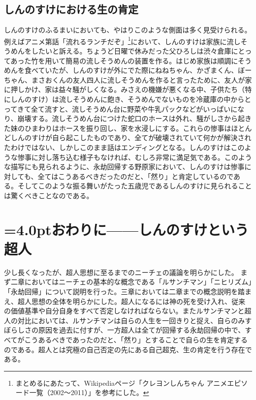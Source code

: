 \documentclass[b5j,twoside,twocolumn]{utarticle}
\begin{document}
\subsection{しんのすけにおける生の肯定}
しんのすけのふるまいにおいても、やはりこのような側面は多く見受けられる。例えばアニメ第話「流れるランチだぞ」\footnote{まとめるにあたって、Wikipediaページ「クレヨンしんちゃん アニメエピソード一覧（2002～2011）」を参考にした。}において、しんのすけは家族に流しそうめんをしたいと訴える。ちょうど日曜で休みだった父ひろしは渋々倉庫にとってあった竹を用いて簡易の流しそうめんの装置を作る。はじめ家族は順調にそうめんを食べていたが、しんのすけが外にでた際にねねちゃん、かざまくん、ぼーちゃん、まさおくんの友人四人に流しそうめんを作ると言ったために、友人が家に押しかけ、家は益々騒がしくなる。みさえの機嫌が悪くなる中、子供たち（特にしんのすけ）は流しそうめんに飽き、そうめんでないものを冷蔵庫の中からとってきて全て流すと、流しそうめん台に野菜や牛乳パックなどがいっぱいになり、崩壊する。流しそうめん台につけた蛇口のホースは外れ、騒がしさから起きた妹のひまわりはホースを振り回し、家を水浸しにする。これらの惨事はほとんどしんのすけが自ら起こしたものであり、全てが破壊されていて何かが解決されたわけではない、しかしこのまま話はエンディングとなる。しんのすけはこのような惨事に対し落ち込む様子もなければ、むしろ非常に満足気である。このような描写にも見られるように、永劫回帰する野原家において、しんのすけは惨事に対しても、全てはこうあるべきだったのだと、「然り」と肯定しているのである。そしてこのような振る舞いがたった五歳児であるしんのすけに見られることは驚くべきことなのである。


\section{\tbaselineshift=4.0ptおわりに------しんのすけという超人}
少し長くなったが、超人思想に至るまでのニーチェの議論を明らかにした。
まず二章においてはニーチェの基本的な概念である「ルサンチマン」「ニヒリズム」「永劫回帰」について説明を行った。三章においては二章までの概念説明を踏まえ、超人思想の全体を明らかにした。超人になるには神の死を受け入れ、従来の価値基準や自分自身をすべて否定しなければならない。またルサンチマンと超人の対比においては、ルサンチマンは自らの人生を一回きりと捉え、自らのみすぼらしさの原因を過去に付すが、一方超人は全てが回帰する永劫回帰の中で、すべてがこうあるべきであったのだと、「然り」とすることで自らの生を肯定するのである。超人とは究極の自己否定の先にある自己超克、生の肯定を行う存在である。
\end{document}
